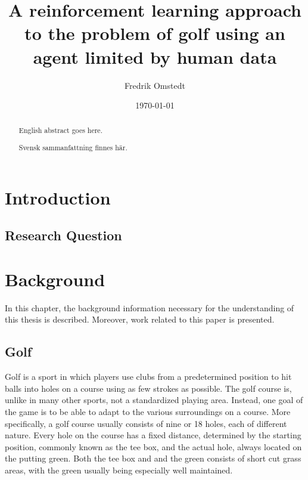 \documentclass{kththesis}
\title{A reinforcement learning approach to the problem of golf using an agent limited by human data}
\author{Fredrik Omstedt}
\date{\today}
\begin{document}
\frontmatter

\titlepage

\begin{abstract}
English abstract goes here.
\end{abstract}

\begin{otherlanguage}{swedish}
\begin{abstract}
Svensk sammanfattning finnes här.
\end{abstract}
\end{otherlanguage}

\tableofcontents

\mainmatter


\chapter{Introduction}
\label{chapter:introduction}

\section{Research Question}


\chapter{Background}
\label{chapter:background}
In this chapter, the background information necessary for the understanding of this thesis is described. Moreover, work related to this paper is presented.

\section{Golf}
\label{sec:golf}
Golf is a sport in which players use clubs from a predetermined position to hit balls into holes on a course using as few strokes as possible. The golf course is, unlike in many other sports, not a standardized playing area. Instead, one goal of the game is to be able to adapt to the various surroundings on a course. More specifically, a golf course usually consists of nine or 18 holes, each of different nature. Every hole on the course has a fixed distance, determined by the starting position, commonly known as the tee box, and the actual hole, always located on the putting green. Both the tee box and and the green consists of short cut grass areas, with the green usually being especially well maintained.
\end{document}
